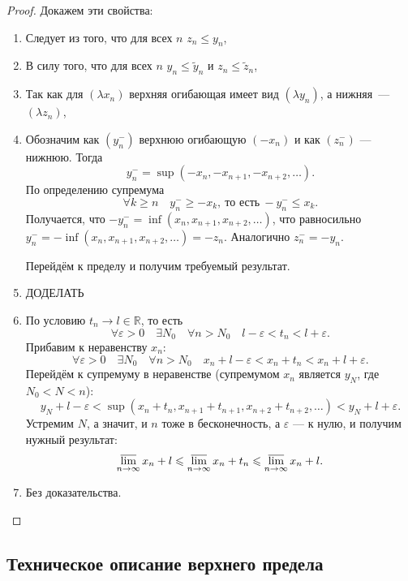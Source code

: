 \begin{proof}
	Докажем эти свойства:
	\begin{enumerate}
		\item Следует из того, что для всех \(n\) \(z_n \leqslant y_n\),
		\item В силу того, что для всех \(n\) \(y_n \leqslant \widetilde{y}_n\) и \(z_n \leqslant \widetilde{z}_n\),
		\item Так как для \((\lambda x_n)\) верхняя огибающая имеет вид \((\lambda y_n)\), а нижняя~--- \((\lambda z_n)\),
		\item Обозначим как \((y_n^-)\) верхнюю огибающую \((-x_n)\) и как \((z_n^-)\) --- нижнюю. Тогда \[
		y_n^- = \sup(-x_n, -x_{n + 1}, -x_{n + 2}, \ldots).
		\]
		По определению супремума \[
		\forall k \geqslant n \quad y_n^- \geqslant -x_k, \ \text{то есть} \ -y_n^- \leqslant x_k.
		\]
		Получается, что \(-y_n^- = \inf(x_n, x_{n + 1}, x_{n + 2}, \ldots)\), что равносильно \linebreak \(y_n^- = -\inf(x_n, x_{n + 1}, x_{n + 2}, \ldots) = -z_n\). Аналогично \(z_n^- = -y_n\).
		
		Перейдём к пределу и получим требуемый результат.
		\item ДОДЕЛАТЬ
		\item По условию \(t_n \to l \in \mathbb{R}\), то есть \[
		\forall \varepsilon > 0 \quad \exists N_0 \quad \forall n > N_0 \quad l - \varepsilon < t_n < l + \varepsilon.
		\]
		Прибавим к неравенству \(x_n\): \[
		\forall \varepsilon > 0 \quad \exists N_0 \quad \forall n > N_0 \quad x_n + l - \varepsilon < x_n + t_n < x_n + l + \varepsilon.
		\]
		Перейдём к супремуму в неравенстве (супремумом \(x_n\) является \(y_{N}\), где \(N_0 < N < n\)): \[
		y_N + l - \varepsilon < \sup(x_n + t_n, x_{n + 1} + t_{n + 1}, x_{n + 2} + t_{n + 2}, \ldots) < y_N + l + \varepsilon.
		\]
		Устремим \(N\), а значит, и \(n\) тоже в бесконечность, а \(\varepsilon\) --- к нулю, и получим нужный результат: \[
		\varlimsup\limits_{n \to \infty} x_n + l \leqslant \varlimsup\limits_{n \to \infty} x_n + t_n \leqslant \varlimsup\limits_{n \to \infty} x_n + l.
		\]
		\item Без доказательства.
	\end{enumerate}
\end{proof}

\subsection{Техническое описание верхнего предела}

